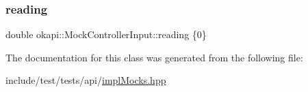 \subsubsection{\texorpdfstring{reading}{reading}}
{\footnotesize\ttfamily double okapi\+::\+Mock\+Controller\+Input\+::reading \{0\}}



The documentation for this class was generated from the following file\+:\begin{DoxyCompactItemize}
\item 
include/test/tests/api/\mbox{\hyperlink{implMocks_8hpp}{impl\+Mocks.\+hpp}}\end{DoxyCompactItemize}

